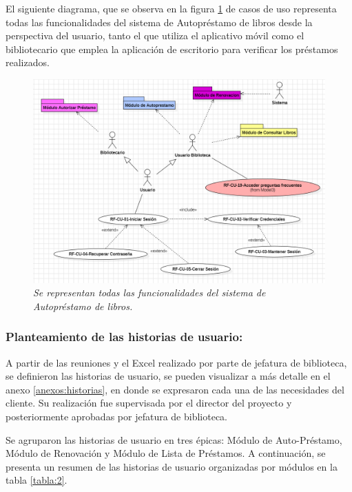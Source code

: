 \documentclass[spanish]{ieee_upb}
\begin{document}
 El siguiente diagrama, que se observa en la figura \ref{fig:diagramaCasosdeUso} de casos de uso representa todas las funcionalidades del sistema de Autopréstamo de libros desde la perspectiva del usuario, tanto el que utiliza el aplicativo móvil como el bibliotecario que emplea la aplicación de escritorio para verificar los préstamos realizados. \vspace{0.3 cm}
  \begin{figure}[H] 
	\centering
	\includegraphics[width=0.7\linewidth]{img/diagramaCasosdeUso.png}
	\vspace{-1mm}
	\caption[Diagrama General de Casos de Uso]{\textit{Se representan todas las funcionalidades del sistema de Autopréstamo de libros.}}
	\label{fig:diagramaCasosdeUso} 
\end{figure}

\subsubsection{ Planteamiento de las historias de usuario:}
 A partir de las reuniones y el Excel realizado por parte de jefatura de biblioteca, se  definieron las historias de usuario, se pueden visualizar a más detalle en el anexo \ref{anexos:historias}, en donde se expresaron cada una de las necesidades del cliente.  Su realización fue supervisada por el director del proyecto y posteriormente aprobadas por jefatura de biblioteca. 
 \vspace{0.3 cm}

Se agruparon las historias de usuario en tres épicas: Módulo de Auto-Préstamo, Módulo de Renovación y Módulo de Lista de Préstamos. A continuación, se presenta un resumen de las historias de usuario organizadas por módulos en la tabla \ref{tabla:2}.
\end{document}
